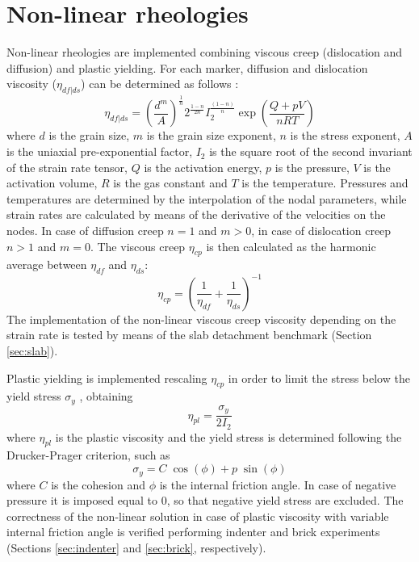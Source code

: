 \documentclass[hidelinks,10pt,a4paper]{article}
\begin{document}
\section{Non-linear rheologies}\label{sec:nonlinear}
Non-linear rheologies are implemented combining viscous creep (dislocation and diffusion) and plastic yielding. For each marker, diffusion and dislocation
viscosity ($\eta_{df|ds}$) can be determined as follows \citep{Karato1993,Wang2016}:
\begin{equation}\label{eq:viscous}
\eta_{df|ds}=\left(\frac{d^m}{A}\right)^{\frac{1}{n}} 2^{\frac{1-n}{2n}} I_2^{\frac{(1-n)}{n}}\exp\left(\frac{Q+pV}{nRT}\right)
\end{equation}
where $d$ is the grain size, $m$ is the grain size exponent, $n$ is the stress exponent, $A$ is the uniaxial pre-exponential factor, $I_2$ is the square root of
the second invariant of the strain rate tensor, $Q$ is the activation energy, $p$ is the pressure, $V$ is the activation volume, $R$ is the gas constant and $T$
is the temperature. Pressures and temperatures are determined by the interpolation of the nodal parameters, while strain rates are calculated by means of the
derivative of the velocities on the nodes. In case of diffusion creep $n=1$ and $m>0$, in case of dislocation creep $n>1$ and $m=0$. The viscous creep $\eta_{cp}$
is then calculated as the harmonic average between $\eta_{df}$ and $\eta_{ds}$:
\begin{equation}\label{eq:visco_creep}
\eta_{cp}=\left(\frac{1}{\eta_{df}}+\frac{1}{\eta_{ds}}\right)^{-1}
\end{equation}
The implementation of the non-linear viscous creep viscosity depending on the strain rate is tested by means of the slab detachment benchmark
(Section \ref{sec:slab}).

Plastic yielding is implemented rescaling $\eta_{cp}$ in order to limit the stress below the yield stress $\sigma_y$ \citep{Thieulot2008,Thieulot2014,Glerum2018},
obtaining
\begin{equation}\label{eq:plastic}
\eta_{pl}=\frac{\sigma_y}{2I_2}
\end{equation}
where $\eta_{pl}$ is the plastic viscosity and the yield stress is determined following the Drucker-Prager criterion, such as
\begin{equation}\label{eq:yield}
\sigma_y=C\;\cos(\phi)+p\;\sin(\phi)
\end{equation}
where $C$ is the cohesion and $\phi$ is the internal friction angle. In case of negative pressure it is imposed equal to 0, so that negative yield stress are
excluded. The correctness of the non-linear solution in case of plastic viscosity with variable internal friction angle is verified performing indenter and
brick experiments (Sections \ref{sec:indenter} and \ref{sec:brick}, respectively).
\end{document}
